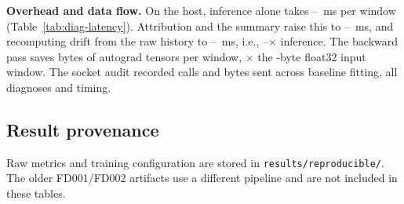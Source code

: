 \begin{table}[t]
\centering
\caption{Single-thread diagnostics overhead per 30-cycle window on the Apple Silicon \texttt{\DiagMachine{}} development host (median of three passes over \DiagWindowsTimed{} windows). This is not a Raspberry Pi~4 measurement.}
\label{tab:diag-latency}
\footnotesize
\setlength{\tabcolsep}{4pt}

\end{table}

\textbf{Overhead and data flow.} On the host, inference alone takes \DiagLatInferenceMin{}--\DiagLatInferenceMax{}~ms per window (Table~\ref{tab:diag-latency}). Attribution and the summary raise this to \DiagLatAttrMin{}--\DiagLatAttrMax{}~ms, and recomputing drift from the raw history to \DiagLatFullMin{}--\DiagLatFullMax{}~ms, i.e., \DiagLatRatioMin{}--\DiagLatRatioMax{}$\times$ inference. The backward pass saves \DiagSavedBytes{} bytes of autograd tensors per window, \DiagSavedToWindowRatio{}$\times$ the \DiagWindowBytes{}-byte float32 input window. The socket audit recorded \DiagSocketCalls{} calls and \DiagBytesSent{} bytes sent across baseline fitting, all diagnoses and timing.

\subsection{Result provenance}
Raw metrics and training configuration are stored in \texttt{results/reproducible/}. The older FD001/FD002 artifacts use a different pipeline and are not included in these tables.
